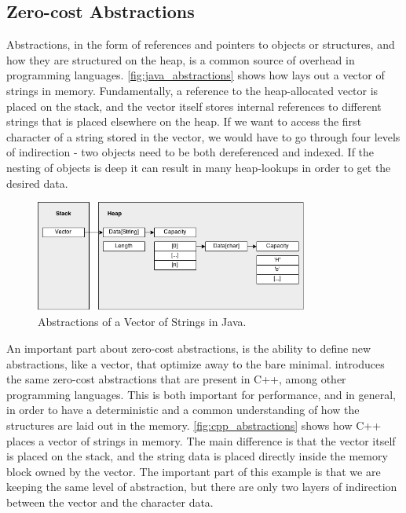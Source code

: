 \subsection{Zero-cost Abstractions}
\label{chap:zero_cost_abstractions}

Abstractions, in the form of references and pointers to objects or structures, and how they are
structured on the heap, is a common source of overhead in programming languages.
\autoref{fig:java_abstractions}  shows how {\Java} lays out a vector of
strings in memory.
Fundamentally, a reference to the heap-allocated vector is placed on the stack, and the vector itself stores internal references to different strings that is placed elsewhere on the heap.
If we want to access the first character of a string stored in the vector, we would have to go through four levels of indirection - two objects need to be both dereferenced and indexed.
If the nesting of objects is deep it can result in many heap-lookups in order to get the desired data.

\begin{figure}[tb]
  \begin{center}
    \includegraphics[width=0.8\textwidth]{figures/java_abstractions}
  \end{center}
  \caption{Abstractions of a Vector of Strings in Java.}
  \label{fig:java_abstractions}
\end{figure}

An important part about zero-cost abstractions, is the ability to define new abstractions, like a vector, that optimize away to the bare minimal.
\rust introduces the same zero-cost abstractions that are present in C++, among other programming languages.
This is both important for performance, and in general, in order to have a deterministic and a common understanding of how the structures are laid out in the memory.
\autoref{fig:cpp_abstractions} shows how C++ places a vector of strings in memory.
The main difference is that the vector itself is placed on the stack, and the string data is placed directly inside the memory block owned by the vector.
The important part of this example is that we are keeping the same level of abstraction, but there are only two layers of indirection between the vector and the character data.

